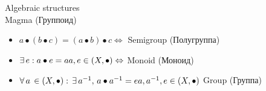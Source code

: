 \documentclass[12pt]{article}
\begin{document}
	\clearpage
	Algebraic structures \\
	Magma (Группоид)
	\begin{itemize}
		\item $a \bullet (b \bullet c) = (a \bullet b) \bullet c \Leftrightarrow $ Semigroup (Полугруппа)
		\item $\exists \, e: a \bullet e = a 
				\\ a, e \in (X, \bullet) \Leftrightarrow $ Monoid (Моноид)
		\item $\forall \, a \, \in (X, \bullet): \, \exists \, a^{-1}, \, a \bullet a^{-1} = e 
				\\ a, a^{-1}, e \in (X, \bullet) $ Group (Группа)
		\end{itemize}
\end{document}
